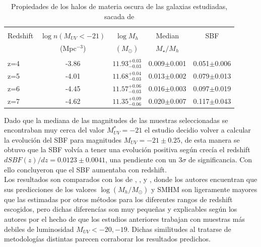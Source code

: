 \begin{table}[h]
\begin{center}
\begin{tabular}{lcccc}
\hline \hline\\
Redshift & $\log n(M_{UV}<-21)$ & $\log M_h$ & Median & SBF \\
	& (Mpc$^{-3}$)& $(M_\odot)$ &	$M_\star/M_h$	&	\\
\hline\\
z=4 & -3.86 & $11.93_{-0.03}^{+0.03}$ & 0.009$\pm$0.001 & 0.051$\pm$0.006\\
z=5 & -4.01 & $11.68_{-0.03}^{+0.04}$ & 0.013$\pm$0.002 & 0.079$\pm$0.013\\
z=6 & -4.45 & $11.57_{-0.03}^{+0.06}$ & 0.016$\pm$0.003 & 0.097$\pm$0.019\\
z=7 & -4.62 & $11.35_{-0.06}^{+0.09}$ & 0.020$\pm$0.007 & 0.117$\pm$0.043\\
\hline
\end{tabular}
\caption{\label{tab:finkelstein2} Propiedades de los halos de materia oscura de las galaxias estudiadas, sacada de \cite{finkelstein2015increasing}}
\end{center}
\end{table}

Dado que la mediana de las magnitudes de las muestras seleccionadas se encontraban muy cerca del valor $M_{UV}^*=-21$ el estudio decidio volver a calcular la evolución del SBF para magnitudes $M_{UV}=-21\pm 0.25$, de esta manera se obtuvo que la SBF volvía a tener una evolución positiva según crecía el redshift $d SBF(z)/dz=0.0123\pm 0.0041$, una pendiente con un $3\sigma$ de significancia. Con ello concluyeron que el SBF aumentaba con redshift.\\

Los resultados son comparados con los de \cite{behroozi2013average}, \cite{barone2014measurement}, \cite{lee2006large} y \cite{overzier2006clustering}, donde los autores encuentran que sus predicciones de los valores $\log(M_h/M_\odot)$ y SMHM son ligeramente mayores que las estimadas por otros métodos para los diferentes rangos de redshift escogidos, pero dichas diferencías son muy pequeñas y explicables según los autores por el hecho de que los estudios anteriores trabajan con muestras más debiles de luminosidad $M_{UV}<-20, -19$. Dichas similitudes al tratarse de metodologías distintas parecen corraborar los resultados predichos. \\

